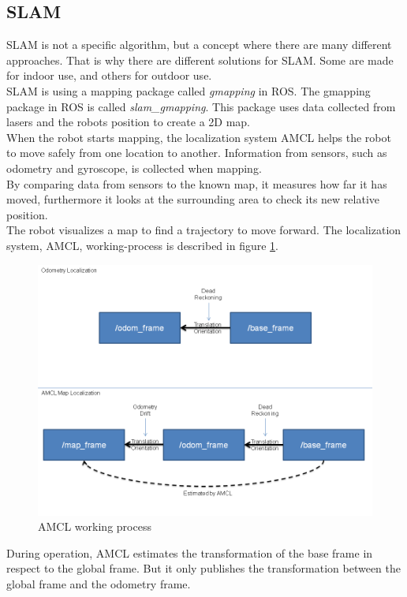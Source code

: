 \subsection{SLAM}
SLAM is not a specific algorithm, but a concept where there are many different approaches. That is why there are different solutions for SLAM. Some are made for indoor use, and others for outdoor use.\\
SLAM is using a mapping package called \textit{gmapping} in ROS. The gmapping package in ROS is called \textit{slam\_gmapping}. This package uses data collected from lasers and the robots position to create a 2D map.\\ %
When the robot starts mapping, the localization system AMCL helps the robot to move safely from one location to another.
Information from sensors, such as odometry and gyroscope, is collected when mapping. \\
By comparing data from sensors to the known map, it measures how far it has moved, furthermore it looks at the surrounding area to check its new relative position.\\The robot visualizes a map to find a trajectory to move forward. The localization system, AMCL, working-process is described in figure \ref{fig:amcl}.
\begin{figure}
    \centering
    \includegraphics[width=.7\textwidth]{figures/AMCL.png}
    \caption{AMCL working process\cite{AMCL}} 
    \label{fig:amcl} 
\end{figure}
 During operation, AMCL estimates the transformation of the base frame in respect to the global frame. But it only publishes the transformation between the global frame and the odometry frame\cite{AMCL}.

